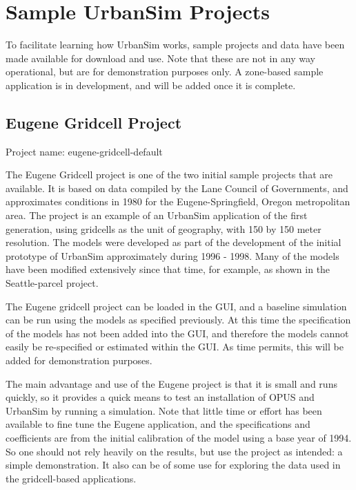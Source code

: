 \chapter{Sample UrbanSim Projects}

To facilitate learning how UrbanSim works, sample projects and data have been made available for download and use.  Note that these are not in any way operational, but are for demonstration purposes only.  A zone-based sample application is in development, and will be added once it is complete.

\section{Eugene Gridcell Project}

Project name: eugene-gridcell-default

The Eugene Gridcell project is one of the two initial sample projects that are available.  It is based on data compiled by the Lane Council of Governments, and approximates conditions in 1980 for the Eugene-Springfield, Oregon metropolitan area.  The project is an example of an UrbanSim application of the first generation, using gridcells as the unit of geography, with 150 by 150 meter resolution.  The models were developed as part of the development of the initial prototype of UrbanSim approximately during 1996 - 1998.  Many of the models have been modified extensively since that time, for example, as shown in the Seattle-parcel project.

The Eugene gridcell project can be loaded in the GUI, and a baseline simulation can be run using the models as specified previously.  At this time the specification of the models has not been added into the GUI, and therefore the models cannot easily be re-specified or estimated within the GUI.  As time permits, this will be added for demonstration purposes. 

The main advantage and use of the Eugene project is that it is small and runs quickly, so it provides a quick means to test an installation of OPUS and UrbanSim by running a simulation.  Note that little time or effort has been available to fine tune the Eugene application, and the specifications and coefficients are from the initial calibration of the model using a base year of 1994.  So one should not rely heavily on the results, but use the project as intended: a simple demonstration.  It also can be of some use for exploring the data used in the gridcell-based applications.  

